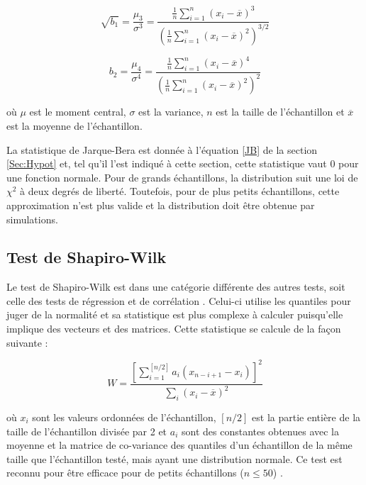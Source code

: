 \documentclass{article}       %
\begin{document}
\begin{equation*}
    \sqrt{b_{1}} = \frac{\mu_{3}}{\sigma^{3}} = \frac{\frac{1}{n}\sum^{n}_{i=1}(x_{i}-\overline{x})^{3}}{\left(\frac{1}{n}\sum^{n}_{i=1}(x_{i}-\overline{x})^{2}\right)^{3/2}}
\end{equation*}

\begin{equation*}
    b_{2} = \frac{\mu_{4}}{\sigma^{4}} = \frac{\frac{1}{n}\sum^{n}_{i=1}(x_{i}-\overline{x})^{4}}{\left(\frac{1}{n}\sum^{n}_{i=1}(x_{i}-\overline{x})^{2}\right)^{2}}
\end{equation*}

où $\mu$ est le moment central, $\sigma$ est la variance, $n$ est la taille de l'échantillon et $\overline{x}$ est la moyenne de l'échantillon. 

La statistique de Jarque-Bera est donnée à l'équation \ref{JB} de la section \ref{Sec:Hypot} et, tel qu'il l'est indiqué à cette section, cette statistique vaut 0 pour une fonction normale. Pour de grands échantillons, la distribution suit une loi de $\chi^{2}$ à deux degrés de liberté. Toutefois, pour de plus petits échantillons, cette approximation n'est plus valide et la distribution doit être obtenue par simulations. 


\subsection{Test de Shapiro-Wilk}

Le test de Shapiro-Wilk est dans une catégorie différente des autres tests, soit celle des tests de régression et de corrélation \cite{GComp}. Celui-ci utilise les quantiles pour juger de la normalité et sa statistique est plus complexe à calculer puisqu'elle implique des vecteurs et des matrices. Cette statistique se calcule de la façon suivante \cite{SWSource}:

\begin{equation*}
    W = \frac{\left[\sum^{\left[n/2\right]}_{i=1}a_{i}(x_{n-i+1}-x_{i})\right]^{2}}{\sum_{i}(x_{i}-\overline{x})^{2}}
\end{equation*}

où $x_{i}$ sont les valeurs ordonnées de l'échantillon, $[n/2]$ est la partie entière de la taille de l'échantillon divisée par 2 et $a_{i}$ sont des constantes obtenues avec la moyenne et la matrice de co-variance des quantiles d'un échantillon de la même taille que l'échantillon testé, mais ayant une distribution normale. Ce test est reconnu pour être efficace pour de petits échantillons ($n\le50$) \cite{SWSource}.
\end{document}
